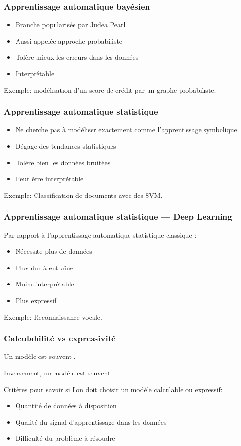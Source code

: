 \documentclass{formation}
\begin{document}
\begin{frame}
  \frametitle{Apprentissage automatique bayésien}
  \begin{itemize}
  \item Branche popularisée par Judea Pearl
  \item Aussi appelée approche probabiliste
  \item Tolère mieux les erreurs dans les données
  \item Interprétable
  \end{itemize}
  Exemple: modélisation d'un score de crédit par un graphe
  probabiliste.
\end{frame}

\begin{frame}
  \frametitle{Apprentissage automatique statistique}
  \begin{itemize}
  \item Ne cherche pas à modéliser exactement comme l'apprentissage symbolique
  \item Dégage des tendances statistiques
  \item Tolère bien les données bruitées
  \item Peut être interprétable
  \end{itemize}
  Exemple: Classification de documents avec des SVM.
\end{frame}

\begin{frame}
  \frametitle{Apprentissage automatique statistique --- Deep Learning}
  Par rapport à l'apprentissage automatique statistique \og classique
  \fg:
  \begin{itemize}
  \item Nécessite plus de données
  \item Plus dur à entraîner
  \item Moins interprétable
  \item Plus expressif
  \end{itemize}
  Exemple: Reconnaissance vocale.
\end{frame}

\begin{frame}
  \frametitle{Calculabilité vs expressivité}

  Un modèle  est souvent .

  Inversement, un modèle  est souvent
  .

  Critères pour savoir si l'on doit choisir un modèle calculable ou
  expressif:
  \begin{itemize}
  \item Quantité de données à disposition
  \item Qualité du signal d'apprentissage dans les données
  \item Difficulté du problème à résoudre
  \end{itemize}
\end{frame}
\end{document}
